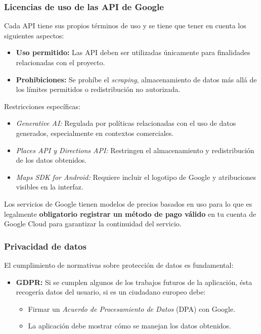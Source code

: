 \begin{enumerate}
\subsubsection{Licencias de uso de las API de Google}
Cada API tiene sus propios términos de uso \cite{google_cloud_terms} y se tiene que tener en cuenta los siguientes aspectos:
\begin{itemize}
	\item \textbf{Uso permitido:} Las API deben ser utilizadas únicamente para finalidades relacionadas con el proyecto.
	\item \textbf{Prohibiciones:} Se prohíbe el \textit{scraping}, almacenamiento de datos más allá de los límites permitidos o redistribución no autorizada.
\end{itemize}

Restricciones específicas:
\begin{itemize}
	\item \textit{Generative AI:} Regulada por políticas relacionadas con el uso de datos generados, especialmente en contextos comerciales.
	\item \textit{Places API y Directions API:} Restringen el almacenamiento y redistribución de los datos obtenidos.
	\item \textit{Maps SDK for Android:} Requiere incluir el logotipo de Google y atribuciones visibles en la interfaz.
\end{itemize}

Los servicios de Google tienen modelos de precios basados en uso para lo que es legalmente\textbf{ obligatorio registrar un método de pago válido} en tu cuenta de Google Cloud para garantizar la continuidad del servicio.

\subsubsection{Privacidad de datos}

El cumplimiento de normativas sobre protección de datos es fundamental:

\begin{itemize}
	\item \textbf{GDPR:} Si se cumplen algunos de los trabajos futuros de la aplicación, ésta recogería datos del usuario, si es un ciudadano europeo debe:
	\begin{itemize}
		\item Firmar un \textit{Acuerdo de Procesamiento de Datos} (DPA) con Google.
		\item La aplicación debe mostrar cómo se manejan los datos obtenidos.
	\end{itemize}
\end{itemize}


\end{enumerate}
